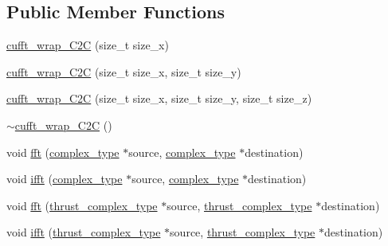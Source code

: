 \subsection*{Public Member Functions}
\begin{DoxyCompactItemize}
\item 
\hyperlink{classcufft__wrap__C2C_3_01float_01_4_a0a4ae85866ec3e7b326ba1e0227a3fff}{cufft\-\_\-wrap\-\_\-\-C2\-C} (size\-\_\-t size\-\_\-x)
\item 
\hyperlink{classcufft__wrap__C2C_3_01float_01_4_a38d27670786f01bf12237e70f5a19662}{cufft\-\_\-wrap\-\_\-\-C2\-C} (size\-\_\-t size\-\_\-x, size\-\_\-t size\-\_\-y)
\item 
\hyperlink{classcufft__wrap__C2C_3_01float_01_4_aaa3f112a7c67c63ef5192f02a377857b}{cufft\-\_\-wrap\-\_\-\-C2\-C} (size\-\_\-t size\-\_\-x, size\-\_\-t size\-\_\-y, size\-\_\-t size\-\_\-z)
\item 
\hyperlink{classcufft__wrap__C2C_3_01float_01_4_a00f885a4c643437f4604c0b5cff60677}{$\sim$cufft\-\_\-wrap\-\_\-\-C2\-C} ()
\item 
void \hyperlink{classcufft__wrap__C2C_3_01float_01_4_a298b36d3008aefb6a0d4fead633afbd6}{fft} (\hyperlink{classcufft__wrap__C2C_3_01float_01_4_a5774ab38d74ec0c5e5f7c8e9f077b9e9}{complex\-\_\-type} $\ast$source, \hyperlink{classcufft__wrap__C2C_3_01float_01_4_a5774ab38d74ec0c5e5f7c8e9f077b9e9}{complex\-\_\-type} $\ast$destination)
\item 
void \hyperlink{classcufft__wrap__C2C_3_01float_01_4_af7e7477ce720af0a19b2a1d454113299}{ifft} (\hyperlink{classcufft__wrap__C2C_3_01float_01_4_a5774ab38d74ec0c5e5f7c8e9f077b9e9}{complex\-\_\-type} $\ast$source, \hyperlink{classcufft__wrap__C2C_3_01float_01_4_a5774ab38d74ec0c5e5f7c8e9f077b9e9}{complex\-\_\-type} $\ast$destination)
\item 
void \hyperlink{classcufft__wrap__C2C_3_01float_01_4_a46f8bac602466f2d0c2bfa999c5075e0}{fft} (\hyperlink{classcufft__wrap__C2C_3_01float_01_4_a6a0bfa6274f9445666985b5aef65f6c3}{thrust\-\_\-complex\-\_\-type} $\ast$source, \hyperlink{classcufft__wrap__C2C_3_01float_01_4_a6a0bfa6274f9445666985b5aef65f6c3}{thrust\-\_\-complex\-\_\-type} $\ast$destination)
\item 
void \hyperlink{classcufft__wrap__C2C_3_01float_01_4_a304a95f6a44362da8300d143ceb1dffb}{ifft} (\hyperlink{classcufft__wrap__C2C_3_01float_01_4_a6a0bfa6274f9445666985b5aef65f6c3}{thrust\-\_\-complex\-\_\-type} $\ast$source, \hyperlink{classcufft__wrap__C2C_3_01float_01_4_a6a0bfa6274f9445666985b5aef65f6c3}{thrust\-\_\-complex\-\_\-type} $\ast$destination)
\end{DoxyCompactItemize}


